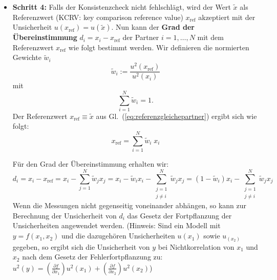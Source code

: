 \begin{itemize}
\item \textbf{Schritt 4:}  \newline
Falls der Konsistenzcheck nicht fehlschlägt, wird der Wert $\tilde x$ als
Referenzwert (KCRV: key comparison reference value) $x_\mathrm{ref}$ akzeptiert
mit der Unsicherheit $u(x_\mathrm{ref}) = u(\tilde x)$. Nun kann der \textbf{Grad
der Übereinstimmung} $d_i = x_i - x_\mathrm{ref}$ der Partner $i=1,\dots, N$ mit dem Referenzwert $x_\mathrm{ref}$ wie folgt bestimmt werden.
Wir definieren die normierten Gewichte $\tilde w_i$
\begin{equation}
\tilde w_i := \frac{u^2(x_\mathrm{ref})}{u^2(x_i)}
\label{eq:anteile}
\end{equation}
mit
\begin{equation}
\sum_{i=1}^{N} \tilde w_i = 1 .
\label{eq:normierung}
\end{equation}
Der Referenzwert $x_\mathrm{ref} \equiv \tilde x$ aus Gl.~(\ref{eq:referenzgleichepartner}) ergibt sich wie folgt:
\begin{equation}
x_\mathrm{ref} = \sum_{i=1}^{N} \tilde w_i\; x_i
\label{eq:referenzgleichepartner2}
\end{equation}

Für den Grad der Übereinstimmung erhalten wir:
\begin{equation}
d_i = x_i - x_\mathrm{ref} = x_i - \sum_{j=1}^{N} \tilde w_j x_j
= x_i - \tilde w_i x_i - \sum_{\substack{j=1 \\ j \neq i}}^{N} \tilde w_j x_j
= (1-\tilde w_i)x_i - \sum_{\substack{j=1 \\ j \neq i}}^{N} \tilde w_j x_j
\end{equation}
Wenn die Messungen nicht gegenseitig voneinander abhängen, so kann
zur Berechnung der Unsicherheit von $d_i$ das Gesetz der Fortpflanzung
der Unsicherheiten angewendet werden. (Hinweis: Sind ein Modell mit $y=f(x_1, x_2)$ und
die dazugehören Unsicherheiten $u(x_1)$ sowie $u_(x_2)$ gegeben, so ergibt sich die Unsicherheit von
$y$ bei Nichtkorrelation von $x_1$ und $x_2$ nach dem Gesetz der Fehlerfortpflanzung zu:
$u^2(y)=\left(\frac{\partial f}{\partial x_1}\right)u^2(x_1)+\left(\frac{\partial f}{\partial x_2}\right)u^2(x_2)$)


\end{itemize}
